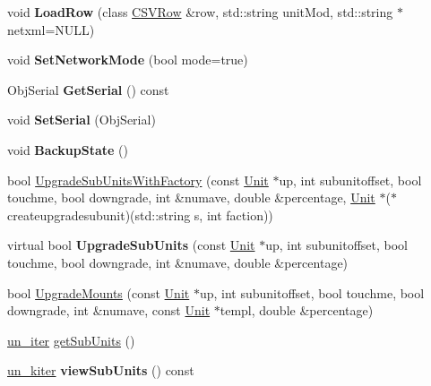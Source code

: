 \begin{DoxyCompactItemize}
\item 
void {\bfseries Load\+Row} (class \hyperlink{classCSVRow}{C\+S\+V\+Row} \&row, std\+::string unit\+Mod, std\+::string $\ast$netxml=N\+U\+LL)\hypertarget{classUnit_a2bdb66a74267593708f1f75a373ee2bb}{}\label{classUnit_a2bdb66a74267593708f1f75a373ee2bb}

\item 
void {\bfseries Set\+Network\+Mode} (bool mode=true)\hypertarget{classUnit_ad55d6aad44da50a288aace3f44dd69d4}{}\label{classUnit_ad55d6aad44da50a288aace3f44dd69d4}

\item 
Obj\+Serial {\bfseries Get\+Serial} () const \hypertarget{classUnit_aa598b327a6667d3c3cb1abddec5c6ca7}{}\label{classUnit_aa598b327a6667d3c3cb1abddec5c6ca7}

\item 
void {\bfseries Set\+Serial} (Obj\+Serial)\hypertarget{classUnit_ac5310c4a7d5f3309ec6d601c79702754}{}\label{classUnit_ac5310c4a7d5f3309ec6d601c79702754}

\item 
void {\bfseries Backup\+State} ()\hypertarget{classUnit_a036ede2a4b5ced8acb9e6ca39aa1140f}{}\label{classUnit_a036ede2a4b5ced8acb9e6ca39aa1140f}

\item 
bool \hyperlink{classUnit_aec19392b9fba96570b5e8fe8918bcfb4}{Upgrade\+Sub\+Units\+With\+Factory} (const \hyperlink{classUnit}{Unit} $\ast$up, int subunitoffset, bool touchme, bool downgrade, int \&numave, double \&percentage, \hyperlink{classUnit}{Unit} $\ast$($\ast$createupgradesubunit)(std\+::string s, int faction))
\item 
virtual bool {\bfseries Upgrade\+Sub\+Units} (const \hyperlink{classUnit}{Unit} $\ast$up, int subunitoffset, bool touchme, bool downgrade, int \&numave, double \&percentage)\hypertarget{classUnit_ab9cc4fa114596ef9ffe67fb0f92ef016}{}\label{classUnit_ab9cc4fa114596ef9ffe67fb0f92ef016}

\item 
bool \hyperlink{classUnit_a0856ef106b785e733a077f3be09376da}{Upgrade\+Mounts} (const \hyperlink{classUnit}{Unit} $\ast$up, int subunitoffset, bool touchme, bool downgrade, int \&numave, const \hyperlink{classUnit}{Unit} $\ast$templ, double \&percentage)
\item 
\hyperlink{classUnitCollection_1_1UnitIterator}{un\+\_\+iter} \hyperlink{classUnit_a68211f28b547231db2e2cf8de2be323d}{get\+Sub\+Units} ()
\item 
\hyperlink{classUnitCollection_1_1ConstIterator}{un\+\_\+kiter} {\bfseries view\+Sub\+Units} () const \hypertarget{classUnit_a75d3780440c7e967bcbb6e577b62b1f4}{}\label{classUnit_a75d3780440c7e967bcbb6e577b62b1f4}


\end{DoxyCompactItemize}

